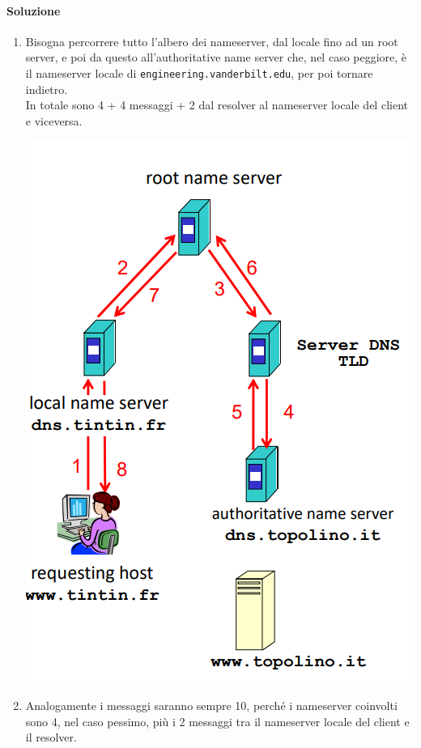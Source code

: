 \documentclass[10pt]{article}
\begin{document}
{\paragraph{Soluzione}
\begin{multicols}{2}
\begin{enumerate}
\item Bisogna percorrere tutto l'albero dei nameserver, dal locale fino ad un root server, e poi da questo all'authoritative name server che, nel caso peggiore, è il nameserver locale di \texttt{engineering.vanderbilt.edu}, per poi tornare indietro.\\
In totale sono 4 + 4 messaggi + 2 dal resolver al nameserver locale del client e viceversa.\begin{center}
\includegraphics[scale=0.3]{dnsqueryricorsiva.png}
\end{center}
\item Analogamente i messaggi saranno sempre 10, perché i nameserver coinvolti sono 4, nel caso pessimo, più i 2 messaggi tra il nameserver locale del client e il resolver.

\end{enumerate}
\end{multicols}}
\end{document}

